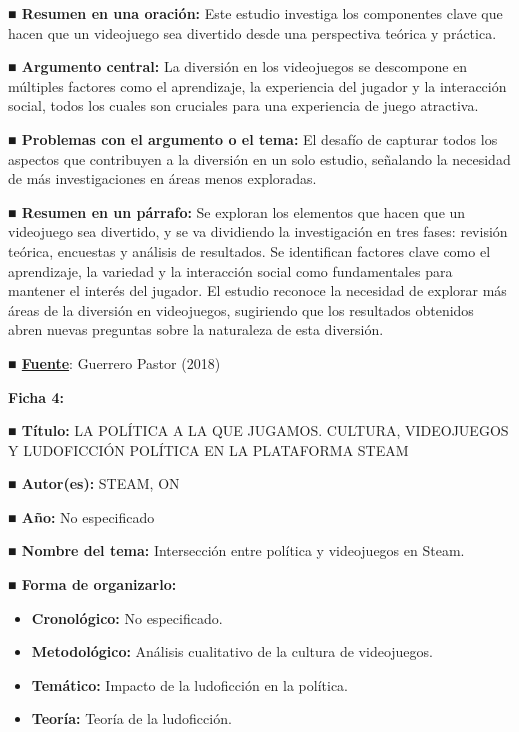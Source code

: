 \documentclass[
  letterpaper,
  DIV=11,
  numbers=noendperiod]{scrreprt}
\begin{document}
\textbf{■ Resumen en una oración:} Este estudio investiga los
componentes clave que hacen que un videojuego sea divertido desde una
perspectiva teórica y práctica.

\textbf{■ Argumento central:} La diversión en los videojuegos se
descompone en múltiples factores como el aprendizaje, la experiencia del
jugador y la interacción social, todos los cuales son cruciales para una
experiencia de juego atractiva.

\textbf{■ Problemas con el argumento o el tema:} El desafío de capturar
todos los aspectos que contribuyen a la diversión en un solo estudio,
señalando la necesidad de más investigaciones en áreas menos exploradas.

\textbf{■ Resumen en un párrafo:} Se exploran los elementos que hacen
que un videojuego sea divertido, y se va dividiendo la investigación en
tres fases: revisión teórica, encuestas y análisis de resultados. Se
identifican factores clave como el aprendizaje, la variedad y la
interacción social como fundamentales para mantener el interés del
jugador. El estudio reconoce la necesidad de explorar más áreas de la
diversión en videojuegos, sugiriendo que los resultados obtenidos abren
nuevas preguntas sobre la naturaleza de esta diversión.

\textbf{■
\href{https://rua.ua.es/dspace/bitstream/10045/73641/1/Que_hace_divertido_un_videojuego_Acercamiento_al_conce_GUERRERO_PASTOR_MARTA.pdf}{Fuente}}:
Guerrero Pastor (2018)

\textbf{Ficha 4:}

\textbf{■ Título:} LA POLÍTICA A LA QUE JUGAMOS. CULTURA, VIDEOJUEGOS Y
LUDOFICCIÓN POLÍTICA EN LA PLATAFORMA STEAM

\textbf{■ Autor(es):} STEAM, ON

\textbf{■ Año:} No especificado

\textbf{■ Nombre del tema:} Intersección entre política y videojuegos en
Steam.

\textbf{■ Forma de organizarlo:}

\begin{itemize}
\item
  \textbf{Cronológico:} No especificado.
\item
  \textbf{Metodológico:} Análisis cualitativo de la cultura de
  videojuegos.
\item
  \textbf{Temático:} Impacto de la ludoficción en la política.
\item
  \textbf{Teoría:} Teoría de la ludoficción.
\end{itemize}
\end{document}
